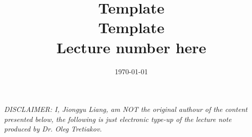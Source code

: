 \documentclass[12pt,english]{article}
\title{\textbf{Template}\\ 
\large Template\\ 
\small Lecture number here}
\date{\today}
\begin{document}
\begin{titlepage}
    \maketitle
    \vfill
    \emph{DISCLAIMER: I, Jiongyu Liang, am NOT the original authour of the content presented %
    below, the following is just electronic type-up of the lecture note produced %
    by Dr. Oleg Tretiakov.}
\end{titlepage}
\cleardoublepage
{}
\newpage
\tableofcontents
\newpage

\newpage
\end{document}
